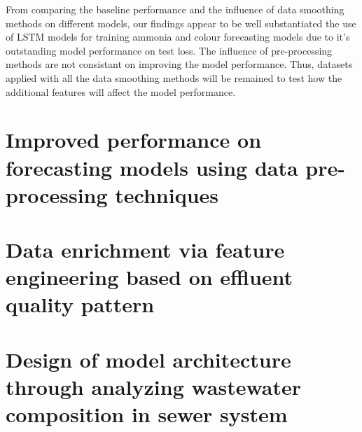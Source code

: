 From comparing the baseline performance and the influence of data smoothing methods on different models, our findings appear to be well substantiated the use of LSTM models for training ammonia and colour forecasting models due to it's outstanding model performance on test loss. The influence of pre-processing methods are not consistant on improving the model performance. Thus, datasets applied with all the data smoothing methods will be remained to test how the additional features will affect the model performance.

\section{Improved performance on forecasting models using data pre-processing techniques}

\section{Data enrichment via feature engineering based on effluent quality pattern}

\section{Design of model architecture through analyzing wastewater composition in sewer system}
